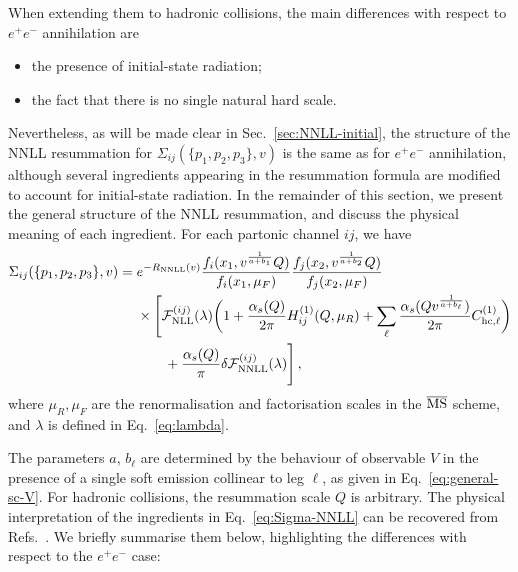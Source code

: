 When extending them to hadronic collisions, the main differences
with respect to $e^+e^-$ annihilation are
\begin{itemize}
\item the presence of initial-state radiation;
\item the fact that there is no single natural hard scale.
\end{itemize}
Nevertheless, as will be made clear in Sec.~\ref{sec:NNLL-initial}, the structure of the NNLL resummation for $\Sigma_{ij}(\{p_1,p_2,p_3\},v)$ is the same as for $e^+e^-$ annihilation, although several ingredients appearing in the
resummation formula are modified to account for initial-state radiation.
 In the remainder of this section, we present the general structure of the NNLL resummation, and discuss the physical meaning of each ingredient. 
 For each partonic channel $ij$, we have 
\begin{equation}
  \label{eq:Sigma-NNLL}
  \begin{split}
  \Sigma_{ij}(\{p_1,p_2,p_3\},v)= {}& e^{-R_{\rm NNLL}(v)} \frac{f_i(x_1,v^{\frac{1}{a+b_1}}Q)}{f_i(x_1,\mu_F)} \frac{f_j(x_2,v^{\frac{1}{a+b_2}}Q)}{f_j(x_2,\mu_F)}\\
  &\times\Bigg[\mathcal{F}^{(ij)}_{\rm NLL}(\lambda)\bigg(1+\frac{\alpha_s(Q)}{2\pi}H_{ij}^{(1)}(Q,\mu_R)+\sum_{\ell}\frac{\alpha_s(Q v^{\frac{1}{a+b_\ell}})}{2\pi}C_{\mathrm{hc},\ell}^{(1)}\bigg)\\
  &\qquad+\frac{\alpha_s(Q)}{\pi} \delta\mathcal{F}^{(ij)}_{\rm NNLL}(\lambda)\Bigg]\,,
  \end{split}
\end{equation}
where $\mu_R,\mu_F$ are the renormalisation and factorisation
scales in the $\overline{\rm MS}$ scheme, and $\lambda$
is defined in Eq.~\eqref{eq:lambda}.

The parameters $a$, $b_\ell$ are determined by the behaviour of
observable $V$ in the presence of a single soft emission
collinear to leg $\ell$, as given in Eq.~\eqref{eq:general-sc-V}. For
hadronic collisions, the resummation scale $Q$ is arbitrary. The
physical interpretation of the ingredients in
Eq.~\eqref{eq:Sigma-NNLL}  can be recovered from
Refs.~\cite{Arpino:2019ozn,Banfi:2018mcq,Banfi:2004yd}. 
We briefly summarise them below, highlighting the differences with
respect to the $e^+e^-$ case:

